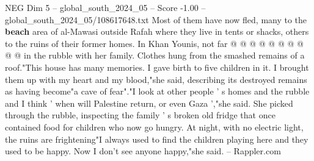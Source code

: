 \begin{textsample}{NEG Dim 5 – global\_south\_2024\_05 – Score -1.00 – global\_south\_2024\_05/108617648.txt}
Most of them have now fled, many to the \textbf{beach} area of al-Mawasi outside Rafah where they live in tents or shacks, others to the ruins of their former homes.
In Khan Younis, not far @ @ @ @ @ @ @ @ @ @ in the rubble with her family.
Clothes hung from the smashed remains of a roof."This house has many memories.
I gave birth to five children in it.
I brought them up with my heart and my blood,"she said, describing its destroyed remains as having become"a cave of fear"."I look at other people ' s homes and the rubble and I think ' when will Palestine return, or even Gaza ',"she said.
She picked through the rubble, inspecting the family ' s broken old fridge that once contained food for children who now go hungry.
At night, with no electric light, the ruins are frightening"I always used to find the children playing here and they used to be happy.
Now I don't see anyone happy,"she said. -- Rappler.com

\end{textsample}
